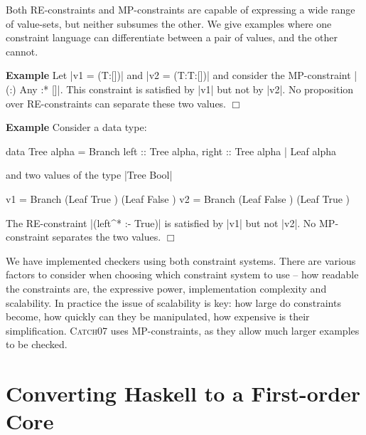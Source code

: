 \documentclass[preprint]{sigplanconf}
\newcommand{\catch}{\textsc{Catch}}
\newcommand{\newtool}{\catch07}
\newcounter{exmp}
\newcommand{\yesexample}{\addtocounter{exmp}{1}\addvspace{2mm}\noindent\textbf{Example \arabic{exmp}}}
\newcommand{\noexample}{\hfill\ensuremath{\Box}\par\addvspace{2mm}}
\newenvironment{example}{\yesexample}{\noexample}
\newcommand{\ignore}{}
\begin{document}
Both RE-constraints and MP-constraints are capable of expressing a wide range of value-sets, but neither subsumes the other. We give examples where one constraint language can differentiate between a pair of values, and the other cannot.

\begin{comment}
\begin{code}
data T = T
\end{code}
\end{comment}

\begin{example}
Let |v1 = (T:[])| and |v2 = (T:T:[])| and consider the MP-constraint \ignore|{(:) Any} :* {[]}|. This constraint is satisfied by |v1| but not by |v2|. No proposition over RE-constraints can separate these two values.
\end{example}

\begin{example}
Consider a data type:

\begin{code}
data Tree alpha  =  Branch {left :: Tree alpha, right :: Tree alpha}
                 |  Leaf alpha
\end{code}

\noindent and two values of the type \ignore|Tree Bool|

\begin{code}
v1 = Branch (Leaf True   ) (Leaf False  )
v2 = Branch (Leaf False  ) (Leaf True   )
\end{code}

\noindent The RE-constraint \ignore|(left^* :- True)| is satisfied by |v1| but not |v2|. No MP-constraint separates the two values.
\end{example}

We have implemented checkers using both constraint systems. There are various factors to consider when choosing which constraint system to use -- how readable the constraints are, the expressive power, implementation complexity and scalability. In practice the issue of scalability is key: how large do constraints become, how quickly can they be manipulated, how expensive is their simplification. \newtool{} uses MP-constraints, as they allow much larger examples to be checked.

\section{Converting Haskell to a First-order Core}
\label{sec:transform}
\end{document}
